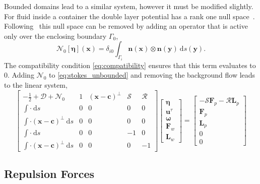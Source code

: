 \documentclass[preprint, 10pt]{elsarticle}
\begin{document}
Bounded domains lead to a similar system, however it must be modified slightly. For fluid inside a container the double layer potential has a rank one null space~\cite{Ladyzhenskaya1963}. Following~\cite{Power1993} this null space can be removed by adding an operator that is active only over the enclosing boundary $\Gamma_0$,
\[ \mathcal{N}_0[\pmb{\eta}](\mathbf{x}) = \delta_{i0} \int_{\Gamma_i}\mathbf{n}(\mathbf{x})\otimes\mathbf{n}(\mathbf{y})~\text{d}s(\mathbf{y}).\]
The compatibility condition \eqref{eq:compatibility} ensures that this term evaluates to 0. Adding $\mathcal{N}_0$ to \eqref{eq:stokes_unbounded} and removing the background flow leads to the linear system,
\begin{equation}\label{eq:stokes_bounded} \begin{bmatrix} -\frac{1}{2} + \mathcal{D} + \mathcal{N}_0 & 1 & (\mathbf{x}-\mathbf{c})^\perp & \mathcal{S} & \mathcal{R}\\
		\int \cdot~ \text{d}s & 0 & 0 & 0 & 0\\
		\int\cdot(\mathbf{x}-\mathbf{c})^\perp~\text{d}s & 0 & 0 & 0 & 0\\
		\int \cdot~ \text{d}s & 0 & 0 & - 1 & 0\\
		\int\cdot(\mathbf{x}-\mathbf{c})^\perp~\text{d}s & 0 & 0 & 0 & -1\end{bmatrix}
\begin{bmatrix}
	\pmb{\eta}\\\mathbf{u}^\tau \\ \pmb{\omega} \\ \mathbf{F}_w \\\mathbf{ L}_w
\end{bmatrix}
=
\begin{bmatrix}
	 - \mathcal{S}\mathbf{F}_p - \mathcal{R}\mathbf{L}_p\\
	\mathbf{F}_p\\
	\mathbf{L}_p\\
	0\\
	0
\end{bmatrix}
\end{equation}



\subsection{Repulsion Forces}
\end{document}
